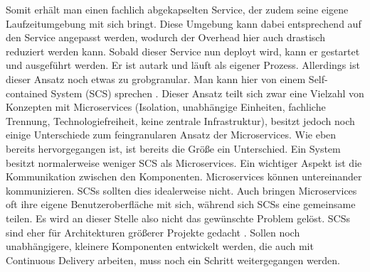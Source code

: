 Somit erhält man einen fachlich abgekapselten Service, der zudem seine eigene Laufzeitumgebung mit sich bringt. Diese Umgebung kann dabei entsprechend auf den Service angepasst werden, wodurch der Overhead hier auch drastisch reduziert werden kann. Sobald dieser Service nun deployt wird, kann er gestartet und ausgeführt werden. Er ist autark und läuft als eigener Prozess. Allerdings ist dieser Ansatz noch etwas zu grobgranular. Man kann hier von einem Self-contained System (SCS) sprechen \cite{jaxcenter.2016}. Dieser Ansatz teilt sich zwar eine Vielzahl von Konzepten mit Microservices (Isolation, unabhängige Einheiten, fachliche Trennung, Technologiefreiheit, keine zentrale Infrastruktur), besitzt jedoch noch einige Unterschiede zum feingranularen Ansatz der Microservices. Wie eben bereits hervorgegangen ist, ist bereits die Größe ein Unterschied. Ein System besitzt normalerweise weniger SCS als Microservices. Ein wichtiger Aspekt ist die Kommunikation zwischen den Komponenten. Microservices können untereinander kommunizieren. SCSs sollten dies idealerweise nicht. Auch bringen Microservices oft ihre eigene Benutzeroberfläche mit sich, während sich SCSs eine gemeinsame teilen. Es wird an dieser Stelle also nicht das gewünschte Problem gelöst. SCSs sind eher für Architekturen größerer Projekte gedacht \cite{selfcontainedservices.2017}. Sollen noch unabhängigere, kleinere Komponenten entwickelt werden, die auch mit Continuous Delivery arbeiten, muss noch ein Schritt weitergegangen werden. 